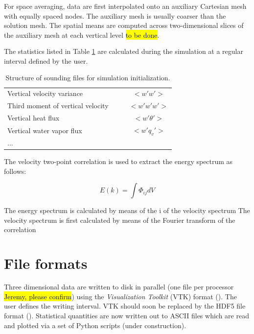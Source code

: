 \documentclass{report}
\begin{document}
For space averaging, data are first interpolated onto an auxiliary Cartesian mesh with equally spaced nodes. The auxiliary mesh is usually coarser than the solution mesh.
The spatial means are computed across two-dimensional slices of the auxiliary mesh at each vertical level  \hl{to be done}.

The statistics listed in Table \ref{tab:stats} are calculated during the simulation at a regular interval defined by the user. 

\begin{table}[t]
\centering
{\footnotesize
\caption[short]{Structure of sounding files for simulation initialization.}
\label{tab:stats}
\begin{tabular*}{\textwidth}{ @{\extracolsep{\fill}} lccc}
\hline
\hline
Vertical velocity variance & & &$<w' w'>$\\
Third moment of vertical velocity & & &$<w'w'w'>$\\
Vertical heat flux & & &$<w' \theta'>$\\
Vertical water vapor flux & & &$<w' q_v'>$\\
...\\
\hline
\hline
\end{tabular*}
}
\end{table}

The velocity two-point correlation is used to extract the energy spectrum as follows:

\begin{equation}
    E(k) = \int \Phi_{ij}dV
\end{equation}

The energy spectrum is calculated by means of the i of the velocity spectrum The velocity spectrum is first calculated by means of the Fourier transform of the correlation 

\section{File formats}
Three dimensional data are written to disk in parallel (one file per processor \hl{Jeremy, please confirm}) using the {\it Visualization Toolkit} (VTK) format (\cite{vtkWeb}). The user defines the writing interval.
VTK should soon be replaced by the HDF5 file format (\cite{hdf5web}).
Statistical quantities are now written out to ASCII files which are read and plotted via a set of Python scripts (under construction).




\end{document}
